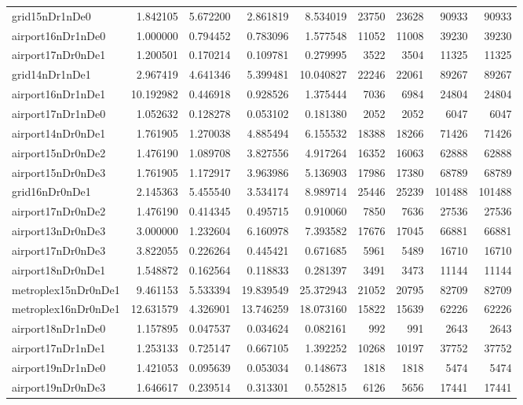 \begin{longtable}{|l|r|r|r|r|r|r|r|r|}
grid15nDr1nDe0 & 1.842105 & 5.672200 & 2.861819 & 8.534019 & 23750 & 23628 & 90933 & 90933 \\
airport16nDr1nDe0 & 1.000000 & 0.794452 & 0.783096 & 1.577548 & 11052 & 11008 & 39230 & 39230 \\
airport17nDr0nDe1 & 1.200501 & 0.170214 & 0.109781 & 0.279995 & 3522 & 3504 & 11325 & 11325 \\
grid14nDr1nDe1 & 2.967419 & 4.641346 & 5.399481 & 10.040827 & 22246 & 22061 & 89267 & 89267 \\
airport16nDr1nDe1 & 10.192982 & 0.446918 & 0.928526 & 1.375444 & 7036 & 6984 & 24804 & 24804 \\
airport17nDr1nDe0 & 1.052632 & 0.128278 & 0.053102 & 0.181380 & 2052 & 2052 & 6047 & 6047 \\
airport14nDr0nDe1 & 1.761905 & 1.270038 & 4.885494 & 6.155532 & 18388 & 18266 & 71426 & 71426 \\
airport15nDr0nDe2 & 1.476190 & 1.089708 & 3.827556 & 4.917264 & 16352 & 16063 & 62888 & 62888 \\
airport15nDr0nDe3 & 1.761905 & 1.172917 & 3.963986 & 5.136903 & 17986 & 17380 & 68789 & 68789 \\
grid16nDr0nDe1 & 2.145363 & 5.455540 & 3.534174 & 8.989714 & 25446 & 25239 & 101488 & 101488 \\
airport17nDr0nDe2 & 1.476190 & 0.414345 & 0.495715 & 0.910060 & 7850 & 7636 & 27536 & 27536 \\
airport13nDr0nDe3 & 3.000000 & 1.232604 & 6.160978 & 7.393582 & 17676 & 17045 & 66881 & 66881 \\
airport17nDr0nDe3 & 3.822055 & 0.226264 & 0.445421 & 0.671685 & 5961 & 5489 & 16710 & 16710 \\
airport18nDr0nDe1 & 1.548872 & 0.162564 & 0.118833 & 0.281397 & 3491 & 3473 & 11144 & 11144 \\
metroplex15nDr0nDe1 & 9.461153 & 5.533394 & 19.839549 & 25.372943 & 21052 & 20795 & 82709 & 82709 \\
metroplex16nDr0nDe1 & 12.631579 & 4.326901 & 13.746259 & 18.073160 & 15822 & 15639 & 62226 & 62226 \\
airport18nDr1nDe0 & 1.157895 & 0.047537 & 0.034624 & 0.082161 & 992 & 991 & 2643 & 2643 \\
airport17nDr1nDe1 & 1.253133 & 0.725147 & 0.667105 & 1.392252 & 10268 & 10197 & 37752 & 37752 \\
airport19nDr1nDe0 & 1.421053 & 0.095639 & 0.053034 & 0.148673 & 1818 & 1818 & 5474 & 5474 \\
airport19nDr0nDe3 & 1.646617 & 0.239514 & 0.313301 & 0.552815 & 6126 & 5656 & 17441 & 17441 \\

\end{longtable}
